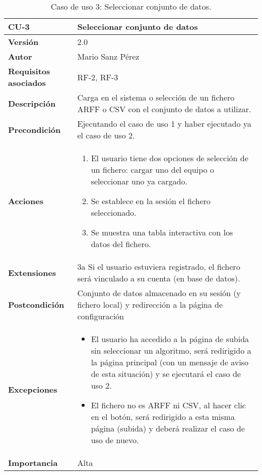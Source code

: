 \begin{table}[p]
	\centering
	\begin{tabularx}{\linewidth}{ p{} p{} }
		\toprule
		\textbf{CU-3}    & \textbf{Seleccionar conjunto de datos}\\
		\toprule
		\textbf{Versión}              & 2.0    \\
		\textbf{Autor}                & Mario Sanz Pérez \\
		\textbf{Requisitos asociados} & RF-2, RF-3 \\
		\textbf{Descripción}          & Carga en el sistema o selección de un fichero ARFF o CSV con el conjunto de datos a utilizar. \\
		\textbf{Precondición}         & Ejecutando el caso de uso 1 y haber ejecutado ya el caso de uso 2.\\
		\textbf{Acciones}             &
		\begin{enumerate}
			\def\labelenumi{\arabic{enumi}.}
			\tightlist
			\item El usuario tiene dos opciones de selección de un fichero: cargar uno del equipo o seleccionar uno ya cargado.
			\item Se establece en la sesión el fichero seleccionado.
			\item Se muestra una tabla interactiva con los datos del fichero.
		\end{enumerate}\\
		\textbf{Extensiones}          & 3a Si el usuario estuviera registrado, el fichero será vinculado a su cuenta (en base de datos). \\
		\textbf{Postcondición}        & Conjunto de datos almacenado en su sesión (y fichero local) y redirección a la página de configuración \\
		\textbf{Excepciones}          & \begin{itemize}
			\item El usuario ha accedido a la página de subida sin seleccionar un algoritmo, será redirigido a la página principal (con un mensaje de aviso de esta situación) y se ejecutará el caso de uso 2.
			\item El fichero no es ARFF ni CSV, al hacer clic en el botón, será redirigido a esta misma página (subida) y deberá realizar el caso de uso de nuevo.
		\end{itemize} \\
		\textbf{Importancia}          & Alta \\
		\bottomrule
	\end{tabularx}
	\caption[CU-03: Seleccionar conjunto de datos]{Caso de uso 3: Seleccionar conjunto de datos.}
\end{table}


